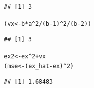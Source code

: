 \documentclass{article}\usepackage[]{graphicx}\usepackage[]{color}
\makeatletter
\newcommand{\hlnum}[1]{\textcolor[rgb]{0.686,0.059,0.569}{#1}}%
\newcommand{\hlopt}[1]{\textcolor[rgb]{0,0,0}{#1}}%
\newcommand{\hlstd}[1]{\textcolor[rgb]{0.345,0.345,0.345}{#1}}%
\newcommand{\hlkwb}[1]{\textcolor[rgb]{0.69,0.353,0.396}{#1}}%
\newenvironment{kframe}{%
 \def\at@end@of@kframe{}%
 \ifinner\ifhmode%
  \def\at@end@of@kframe{\end{minipage}}%
  \begin{minipage}{\columnwidth}%
 \fi\fi%
 \def\FrameCommand##1{\hskip\@totalleftmargin \hskip-\fboxsep
 \colorbox{shadecolor}{##1}\hskip-\fboxsep
     \hskip-\linewidth \hskip-\@totalleftmargin \hskip\columnwidth}%
 \MakeFramed {\advance\hsize-\width
   \@totalleftmargin\z@ \linewidth\hsize
   \@setminipage}}%
 {\par\unskip\endMakeFramed%
 \at@end@of@kframe}
\newenvironment{knitrout}{}{} %
\makeatother
\begin{document}
\begin{knitrout}
\begin{kframe}
\begin{alltt}
\end{alltt}
\begin{verbatim}
## [1] 3
\end{verbatim}
\begin{alltt}
\hlstd{(vx} \hlkwb{<-} \hlstd{b}\hlopt{*}\hlstd{a}\hlopt{^}\hlnum{2}\hlopt{/}\hlstd{(b}\hlopt{-}\hlnum{1}\hlstd{)}\hlopt{^}\hlnum{2}\hlopt{/}\hlstd{(b}\hlopt{-}\hlnum{2}\hlstd{))}
\end{alltt}
\begin{verbatim}
## [1] 3
\end{verbatim}
\begin{alltt}
\hlstd{ex2} \hlkwb{<-} \hlstd{ex}\hlopt{^}\hlnum{2}\hlopt{+}\hlstd{vx}
\hlstd{(mse} \hlkwb{<-} \hlstd{(ex_hat}\hlopt{-}\hlstd{ex)}\hlopt{^}\hlnum{2}\hlstd{)}
\end{alltt}
\begin{verbatim}
## [1] 1.68483
\end{verbatim}
\end{kframe}
\end{knitrout}
\end{document}
